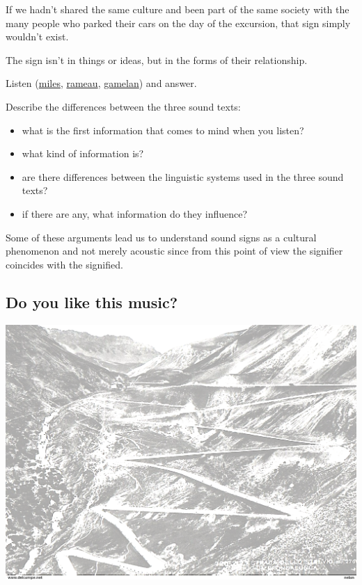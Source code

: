 If we hadn't shared the same culture and been part of the same society with the many people who parked their cars on the day of the excursion, that sign simply wouldn't exist.

The sign isn't in things or ideas, but in the forms of their relationship.

Listen (\href{URL}{miles}, \href{URL}{rameau}, \href{URL}{gamelan}) and answer.

Describe the differences between the three sound texts: 

\begin{itemize}
\tightlist
\item what is the first information that comes to mind when you listen? 
\item what kind of information is? 
\item are there differences between the linguistic systems used in the three sound texts? \item if there are any, what information do they influence?
\end{itemize}

Some of these arguments lead us to understand sound signs as a cultural phenomenon and not merely acoustic since from this point of view the signifier coincides with the signified.

\subsection{Do you like this music?}\label{do-you-like-this-music}

\begin{center}
\includegraphics[scale=0.4]{../img/valore.png}
\end{center}

